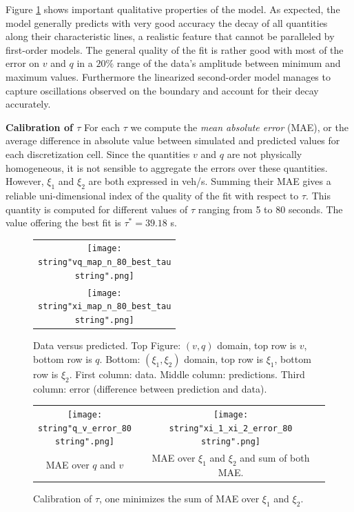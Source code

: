 \documentclass[preprint]{elsarticle}
\begin{document}
Figure \ref{fig:Data-versus-predicted.} shows important qualitative properties of the model. As expected, the model generally predicts with very good accuracy the decay of all quantities along their characteristic lines, a realistic feature that cannot be paralleled by first-order models. The general quality of the fit is rather good with most of the error on $v$ and $q$ in a $20\%$ range of the data's amplitude between minimum and maximum values. Furthermore the linearized second-order model manages to capture oscillations observed on the boundary and account for their decay accurately. 

\textbf{Calibration of $\tau$\label{sub:Calibration-of-tau}} For each $\tau$ we compute the \textit{mean absolute error} (MAE), or the average difference in absolute value between simulated and predicted values for each discretization cell. Since the quantities $v$ and $q$ are not physically homogeneous, it is not sensible to aggregate the errors over these quantities. However, $\xi_{1}$
and $\xi_{2}$ are both expressed in veh/s. Summing their MAE gives a reliable uni-dimensional index of the quality of the fit with respect
to $\tau$. This quantity is computed for different values of $\tau$
ranging from 5 to 80 seconds. The value offering the best fit
is $\tau^{*}=39.18$ s.

\begin{figure}[H]
\centering
\begin{tabular}{c}
\texttt{[image: \\string"vq\_map\_n\_80\_best\_tau\\string".png]}\tabularnewline
\texttt{[image: \\string"xi\_map\_n\_80\_best\_tau\\string".png]}
\end{tabular}
\protect\caption{Data versus predicted. Top Figure: $\left(v,q\right)$ domain, top row is $v$, bottom row is $q$. Bottom: $\left(\xi_{1},\xi_{2}\right)$
domain, top row is $\xi_{1}$, bottom row is $\xi_{2}$. First column: data. Middle column: predictions. Third column: error (difference between prediction and data).\label{fig:Data-versus-predicted.}}
\end{figure}

\begin{figure}[H]
\centering
\begin{tabular}{cc}
\texttt{[image: \\string"q\_v\_error\_80\\string".png]} 
& \texttt{[image: \\string"xi\_1\_xi\_2\_error\_80\\string".png]}\tabularnewline
MAE over $q$ and $v$ & MAE over $\xi_{1}$ and $\xi_{2}$ and sum of both MAE.\tabularnewline
\end{tabular}
\protect\caption{Calibration of $\tau$, one minimizes the sum of MAE over $\xi_{1}$
and $\xi_{2}$.}
\end{figure}
\end{document}
